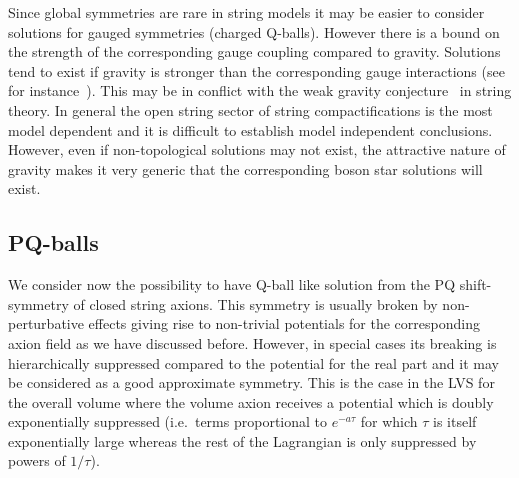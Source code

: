 \documentclass[11pt,a4paper]{article}
\begin{document}
Since global symmetries are rare in string models it may be easier to consider solutions for gauged symmetries (charged Q-balls). However there is a bound on the strength of the corresponding gauge coupling compared to gravity. Solutions tend to exist if gravity is stronger than the corresponding gauge interactions (see for instance~\cite{0801.0307, 1202.5809}). This may be in conflict with the weak gravity conjecture~\cite{ArkaniHamed:2006dz} in string theory. In general the open string sector of string compactifications is the most model dependent  and it is difficult to establish model independent conclusions. However, even if non-topological solutions may not exist, the attractive nature of gravity makes it very generic that the corresponding boson star solutions will exist.

\subsection{PQ-balls}
\label{sec:PQBalls}

We consider now the possibility to have Q-ball like solution from the PQ shift-symmetry of closed string axions. This symmetry is usually broken by non-perturbative effects giving rise to non-trivial potentials for the corresponding axion field as we have discussed before. However, in special cases its breaking is hierarchically suppressed compared to the potential for the real part and it may be considered as a good approximate symmetry. This is the case in the LVS for the overall volume where the volume axion receives a potential which is doubly exponentially suppressed (i.e.~terms proportional to $e^{-a\tau}$ for which $\tau$ is itself exponentially large whereas the rest of the Lagrangian is only suppressed by powers of $1/\tau$).
\end{document}
